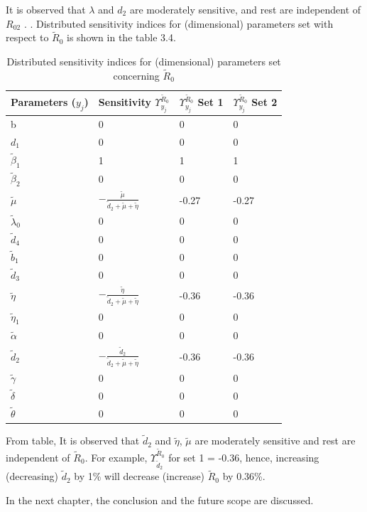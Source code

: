 \par It is observed that $\lambda$ and $d_2$ are moderately
sensitive, and rest are independent of $R_{02}$ .
. Distributed sensitivity indices for (dimensional) parameters set with respect to $\tilde R_0$ is shown in the table 3.4.
\begin{table}[h]
\label{table:sensi}
\begin{tabular}{|p{3 cm}|p{4 cm}|p{3 cm}|p{3 cm}|}
\hline
\bf Parameters ($y_j$) & \bf Sensitivity $ \Upsilon_{y_j}^{\tilde R_0} $&\bf $ \Upsilon_{y_j}^{\tilde R_0} $ Set 1&\bf $ \Upsilon_{y_j}^{\tilde R_0} $ Set 2\\
\hline
b &0&0&0\\
$d_1$ &0&0&0\\
$\tilde \beta_1$ &1&1&1\\
$\tilde \beta_2$ &0&0&0\\
$\tilde\mu$ &$-\frac{\tilde \mu}{\tilde d_2+\tilde \mu+\tilde\eta}$&-0.27&-0.27\\
$\tilde\lambda_0$ &$0$&0&0\\
$\tilde d_4$ &0&0&0\\
$\tilde b_1$ &0&0&0\\
$\tilde d_3$ &0&0&0\\
$\tilde\eta$ &$-\frac{\tilde \eta}{\tilde d_2+\tilde \mu+\tilde\eta}$&-0.36&-0.36\\
$\tilde\eta_1$ &0&0&0\\
$\tilde\alpha$ &0&0&0\\
$\tilde d_2$ &$-\frac{\tilde d_2}{\tilde d_2+\tilde \mu+\tilde\eta}$&-0.36&-0.36\\
$\tilde \gamma$ &0&0&0\\
$\tilde \delta$&0&0&0\\
$\tilde \theta$ &0&0&0\\
\hline
\end{tabular}
\caption {Distributed sensitivity indices for (dimensional) parameters set concerning $\tilde R_0$ }
\end{table}
\par From table, It is observed that $\tilde d_2$ and $\tilde \eta$, $\tilde \mu$ are moderately
sensitive and rest are independent of $\tilde R_0$. For example, $ \Upsilon_{\tilde d_2}^{\tilde R_0}$
for set 1 = -0.36, hence, increasing (decreasing) $\tilde d_2$ by 1\% will decrease (increase) $\tilde R_0$ by
0.36\%.
\par In the next chapter, the conclusion and the future scope are discussed. 